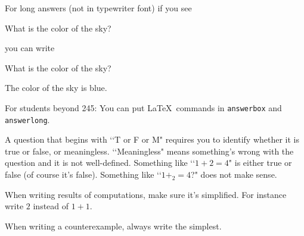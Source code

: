 For long answers (not in typewriter font) if you see
\begin{console}[frame=single=single, fontsize=\small]
What is the color of the sky?
\begin{answerlong}
\end{answerlong}
\end{console}
you can write
\begin{console}[frame=single=single, fontsize=\small]
What is the color of the sky?
\begin{answerlong}
The color of the sky is blue.
\end{answerlong}
\end{console}
For students beyond 245: You can put \LaTeX\ commands in
\verb!answerbox! and 
\verb!answerlong!.

A question that begins with \lq\lq T or F or M"
requires you to identify whether it is true or
false, or meaningless.
\lq\lq Meaningless" means something's wrong with the question and
it is not well-defined.
Something like
\lq\lq $1 + 2 = 4$" is either true or false (of course it's false).
Something like
\lq\lq $1 +_2 = 4$?" does not make sense.

When writing results of computations, make sure it's simplified.
For instance write $2$ instead of $1 + 1$.

When writing a counterexample, always write the simplest.
